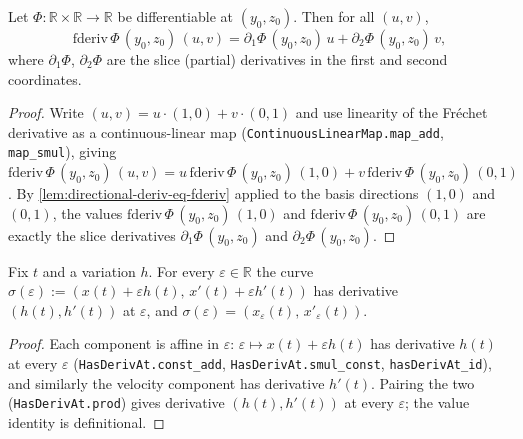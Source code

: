 \begin{lemma}
    \label{lem:fderiv-decomp}
    \leanok
    Let $\Phi : \mathbb{R} \times \mathbb{R} \to \mathbb{R}$ be differentiable at
    $(y_0, z_0)$. Then for all $(u, v)$,
    \[
      \mathrm{fderiv}\,\Phi\,(y_0, z_0)\,(u, v)
        = \partial_1 \Phi\,(y_0, z_0)\, u + \partial_2 \Phi\,(y_0, z_0)\, v ,
    \]
    where $\partial_1 \Phi$, $\partial_2 \Phi$ are the slice (partial) derivatives
    in the first and second coordinates.
\end{lemma}
\begin{proof}
    Write $(u, v) = u\cdot(1,0) + v\cdot(0,1)$ and use linearity of the Fr\'echet
    derivative as a continuous-linear map
    (\texttt{ContinuousLinearMap.map\_add}, \texttt{map\_smul}), giving
    $\mathrm{fderiv}\,\Phi\,(y_0,z_0)\,(u,v) =
      u\,\mathrm{fderiv}\,\Phi\,(y_0,z_0)\,(1,0)
      + v\,\mathrm{fderiv}\,\Phi\,(y_0,z_0)\,(0,1)$. By
    \cref{lem:directional-deriv-eq-fderiv} applied to the basis directions
    $(1,0)$ and $(0,1)$, the values $\mathrm{fderiv}\,\Phi\,(y_0,z_0)\,(1,0)$ and
    $\mathrm{fderiv}\,\Phi\,(y_0,z_0)\,(0,1)$ are exactly the slice derivatives
    $\partial_1 \Phi\,(y_0,z_0)$ and $\partial_2 \Phi\,(y_0,z_0)$.
\end{proof}

\begin{lemma}
    \label{lem:variation-curve-hasDerivAt}
    \leanok
    Fix $t$ and a variation $h$. For every $\varepsilon \in \mathbb{R}$ the curve
    $\sigma(\varepsilon) := (x(t) + \varepsilon h(t),\, x'(t) + \varepsilon h'(t))$
    has derivative $(h(t), h'(t))$ at $\varepsilon$, and
    $\sigma(\varepsilon) = (x_\varepsilon(t),\, x'_\varepsilon(t))$.
\end{lemma}
\begin{proof}
    Each component is affine in $\varepsilon$: $\varepsilon \mapsto x(t) +
    \varepsilon h(t)$ has derivative $h(t)$ at every $\varepsilon$
    (\texttt{HasDerivAt.const\_add}, \texttt{HasDerivAt.smul\_const},
    \texttt{hasDerivAt\_id}), and similarly the velocity component has derivative
    $h'(t)$. Pairing the two (\texttt{HasDerivAt.prod}) gives derivative
    $(h(t), h'(t))$ at every $\varepsilon$; the value identity is definitional.
\end{proof}

